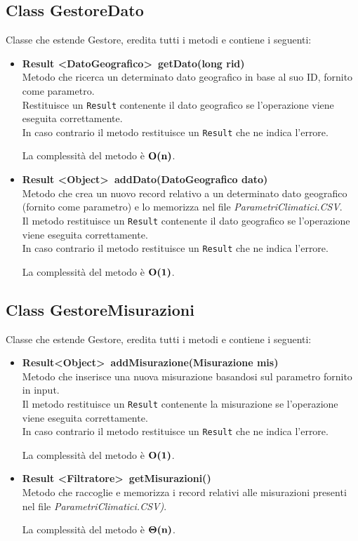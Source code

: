 \documentclass[a4paper, 12pt]{scrreprt}
\begin{document}
			\subsection{Class GestoreDato}
			Classe che estende Gestore, eredita tutti i metodi e contiene i seguenti:
			\begin{itemize}
				\item \textbf{Result \textless DatoGeografico\textgreater~getDato(long rid)}
				\\Metodo che ricerca un determinato dato geografico in base al suo ID, fornito come parametro.
				\\Restituisce un \verb!Result! contenente il dato geografico se l'operazione viene eseguita correttamente.
				\\In caso contrario il metodo restituisce un \verb!Result! che ne indica l'errore.
				
				La complessit\`a del metodo \`e $\mathbf{O}\textbf{(n)}$.
			\pagebreak	
				\item \textbf {Result \textless Object\textgreater~addDato(DatoGeografico dato)}
				\\Metodo che crea un nuovo record relativo a un determinato dato geografico (fornito come parametro) e lo memorizza nel file \textsl{ParametriClimatici.CSV}.
				\\Il metodo restituisce un \verb!Result! contenente il dato geografico se l'operazione viene eseguita correttamente.
				\\In caso contrario il metodo restituisce un \verb!Result! che ne indica l'errore.
				
				La complessit\`a del metodo \`e $\mathbf{O}\textbf{(1)}$.
				
			\end{itemize}

			\subsection{Class GestoreMisurazioni}
			Classe che estende Gestore, eredita tutti i metodi e contiene i seguenti:
			\begin{itemize}
				\item \textbf{Result\textless Object\textgreater~addMisurazione(Misurazione mis)}
				\\Metodo che inserisce una nuova misurazione basandosi sul parametro fornito in input.
				\\Il metodo restituisce un \verb!Result! contenente la misurazione se l'operazione viene eseguita correttamente.
				\\In caso contrario il metodo restituisce un \verb!Result! che ne indica l'errore.
				
				La complessit\`a del metodo \`e $\mathbf{O}\textbf{(1)}$.

				\item \textbf {Result \textless Filtratore\textgreater~getMisurazioni()}
				\\Metodo che raccoglie e memorizza i record relativi alle misurazioni presenti nel file \textsl{ParametriClimatici.CSV)}.
				
				La complessit\`a del metodo \`e $\mathbf{\Theta}\textbf{(n)}$.
				
			\end{itemize}
\pagebreak
\end{document}
